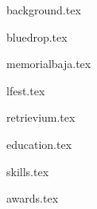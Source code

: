 \documentclass[11pt]{article}
\begin{document}
{background.tex}


{bluedrop.tex}

{memorialbaja.tex}

{lfest.tex}

{retrievium.tex}


{education.tex}


{skills.tex}


{awards.tex}
\end{document}
